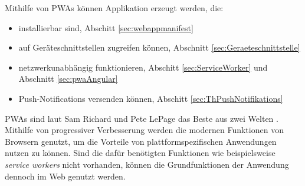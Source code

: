 Mithilfe von PWAs können Applikation erzeugt werden, die: 
\begin{itemize}
    \item installierbar sind, Abschitt \ref{sec:webappmanifest} 
    \item auf Geräteschnittstellen zugreifen können, Abschnitt \ref{sec:Geraeteschnittstelle} 
    \item netzwerkunabhängig funktionieren, Abschitt \ref{sec:ServiceWorker} und Abschnitt \ref{sec:pwaAngular}
    \item Push-Notifications versenden können, Abschitt \ref{sec:ThPushNotifikations}
\end{itemize}

PWAs sind laut Sam Richard und Pete LePage das Beste aus zwei Welten \cite{SamRichard2020}. Mithilfe von progressiver Verbesserung werden die modernen Funktionen von Browsern genutzt, um die Vorteile von plattformspezifischen Anwendungen nutzen zu können. Sind die dafür benötigten Funktionen wie beispielsweise \textit{service workers} nicht vorhanden, können die Grundfunktionen der Anwendung dennoch im Web genutzt werden. 


